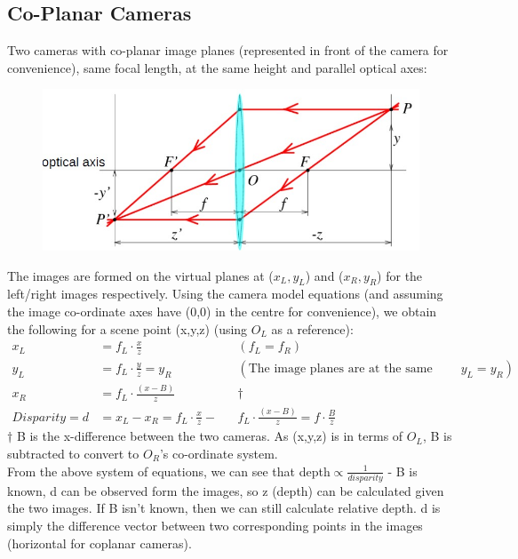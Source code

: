 \subsection{Co-Planar Cameras}
Two cameras with co-planar image planes (represented in front of the camera for convenience), same focal length, at the same height and parallel optical axes:
\begin{figure}[H]
    \centering
    \includegraphics[width = \textwidth]{Images/Thin_Lens_Diagram} %
\end{figure}
The images are formed on the virtual planes at ($x_L,y_L$) and ($x_R,y_R$) for the left/right images respectively. Using the camera model equations (and assuming the image co-ordinate axes have (0,0) in the centre for convenience), we obtain the following for a scene point (x,y,z) (using $O_L$ as a reference):
\begin{align}
    x_L &= f_L \cdot \frac{x}{z} &&(f_L = f_R) \nonumber\\
    y_L &= f_L \cdot \frac{y}{z} = y_R &&(\text{The image planes are at the same height, so }y_L = y_R) \nonumber\\
    x_R &= f_L \cdot \frac{(x-B)}{z} && \dagger \nonumber\\
    Disparity = d &=  x_L - x_R = f_L \cdot \frac{x}{z} - &&f_L \cdot \frac{(x-B)}{z} = f \cdot \frac{B}{z}
\end{align}
$\dagger$ B is the x-difference between the two cameras. As (x,y,z) is in terms of $O_L$, B is subtracted to convert to $O_R$'s co-ordinate system.\\

From the above system of equations, we can see that depth$\propto\frac{1}{disparity}$ - B is known, d can be observed form the images, so z (depth) can be calculated given the two images. If B isn't known, then we can still calculate relative depth. d is simply the difference vector between two corresponding points in the images (horizontal for coplanar cameras). 

